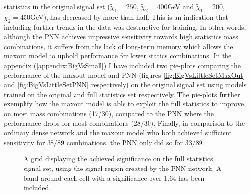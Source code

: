 statistics in the original signal set ($\tilde{\chi}_1=250$, $\tilde{\chi}_2=400$GeV and $\tilde{\chi}_1=200$, $\tilde{\chi}_2=450$GeV), has decreased by more than half.
This is an indication that including further trends in the data was destructive for training. In other words, although the \ac{PNN} achieves impressive sensitivity towards high 
statistics mass combinations, it suffers from the lack of long-term memory which allows the maxout model to uphold performance for lower statics combinations. In the appendix 
(\ref{appendix:BigVsSmall}) I have included two pie-plots comparing the performance of the maxout model and \ac{PNN} (figures \ref{fig:BigVsLittleSetMaxOut} and \ref{fig:BigVsLittleSetPNN} 
respectively) on the original signal set using models trained on the original and full statistics set respectively. The pie-plots further exemplify how the maxout model is able to exploit 
the full statistics to improve on most mass combinations (17/30), compared to the \ac{PNN} where the performance drops for most combinations (28/30). Finally, in comparison to the ordinary 
dense network and the maxout model who both achieved sufficient sensitivity for 38/89 combinations, the \ac{PNN} only did so for 33/89.\\
\begin{figure}
    \caption{A grid displaying the achieved significance on the full statistics signal set, using the signal region 
    created by the \acs{PNN} network. A band around each cell with a significance over 1.64 has been included.}
    \label{fig:PNNPCA_FS_MLMGridSig}
\end{figure}
